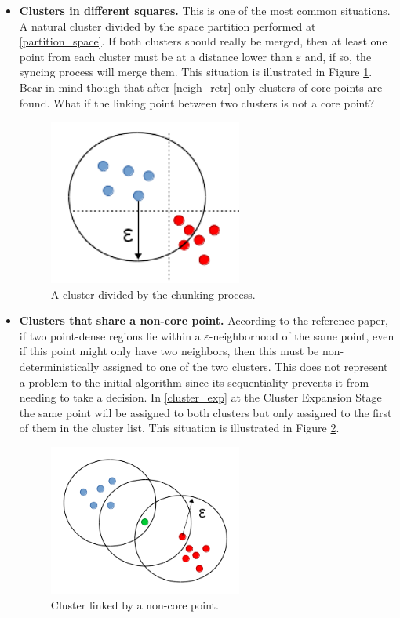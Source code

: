 \documentclass[10pt,journal,compsoc]{IEEEtran}
\let\MYoriglatexcaption\caption
\renewcommand{\caption}[2][\relax]{\MYoriglatexcaption[#2]{#2}}
\begin{document}
\begin{itemize}
\item \textbf{Clusters in different squares.} This is one of the most common situations. A natural cluster divided by the space partition performed at \ref{partition_space}. If both clusters should really be merged, then at least one point from each cluster must be at a distance lower than $\varepsilon$ and, if so, the syncing process will merge them. This situation is illustrated in Figure \ref{test_case1}. Bear in mind though that after \ref{neigh_retr} only clusters of core points are found.  What if the linking point between two clusters is not a core point?
\begin{figure}[!h]
\centering
\includegraphics[width=2.5in]{img/test_case1.png}
\caption{A cluster divided by the chunking process.}
\label{test_case1}
\end{figure}
\item \textbf{Clusters that share a non-core point.} According to the reference paper, if two point-dense regions lie within a $\varepsilon$-neighborhood of the same point, even if this point might only have two neighbors, then this must be non-deterministically assigned to one of the two clusters. This does not represent a problem to the initial algorithm since its sequentiality prevents it from needing to take a decision. In \ref{cluster_exp} at the Cluster Expansion Stage the same point will be assigned to both clusters but only assigned to the first of them in the cluster list. This situation is illustrated in Figure \ref{test_case2}.
\begin{figure}[!h]
\centering
\includegraphics[width=2.5in]{img/test_case2.png}
\caption{Cluster linked by a non-core point.}
\label{test_case2}
\end{figure}
\end{itemize}
\end{document}
